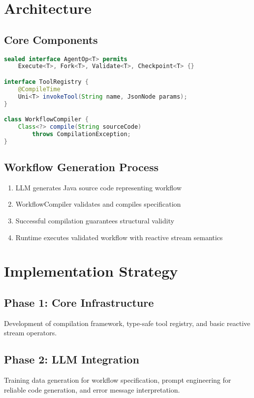\documentclass[11pt,a4paper]{article}
\begin{document}
\section{Architecture}

\subsection{Core Components}

\begin{lstlisting}[language=Java, caption=Core Type Definitions]
sealed interface AgentOp<T> permits 
    Execute<T>, Fork<T>, Validate<T>, Checkpoint<T> {}

interface ToolRegistry {
    @CompileTime
    Uni<T> invokeTool(String name, JsonNode params);
}

class WorkflowCompiler {
    Class<?> compile(String sourceCode) 
        throws CompilationException;
}
\end{lstlisting}

\subsection{Workflow Generation Process}

\begin{enumerate}
    \item LLM generates Java source code representing workflow
    \item WorkflowCompiler validates and compiles specification
    \item Successful compilation guarantees structural validity
    \item Runtime executes validated workflow with reactive stream semantics
\end{enumerate}

\section{Implementation Strategy}

\subsection{Phase 1: Core Infrastructure}
Development of compilation framework, type-safe tool registry, and basic reactive stream operators.

\subsection{Phase 2: LLM Integration}
Training data generation for workflow specification, prompt engineering for reliable code generation, and error message interpretation.
\end{document}
